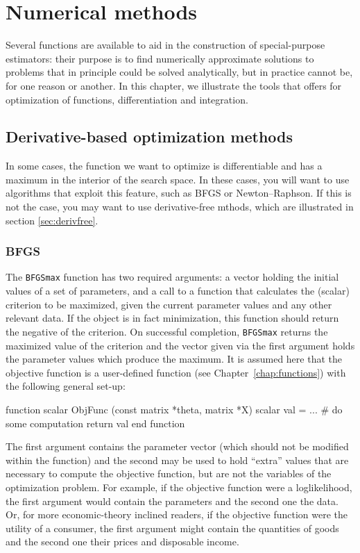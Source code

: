 \chapter{Numerical methods}
\label{chap:numerical}

Several functions are available to aid in the construction of
special-purpose estimators: their purpose is to find numerically
approximate solutions to problems that in principle could be solved
analytically, but in practice cannot be, for one reason or another. In
this chapter, we illustrate the tools that  offers for
optimization of functions, differentiation and integration.

\section{Derivative-based optimization methods}

In some cases, the function we want to optimize is differentiable and
has a maximum in the interior of the search space. In these cases, you
will want to use algorithms that exploit this feature, such as BFGS or
Newton--Raphson. If this is not the case, you may want to use
derivative-free mthods, which are illustrated in section \ref{sec:derivfree}.

\subsection{BFGS}
\label{sec:BFGSmax}

The \texttt{BFGSmax} function has two required arguments: a vector
holding the initial values of a set of parameters, and a call to a
function that calculates the (scalar) criterion to be maximized, given
the current parameter values and any other relevant data.  If the
object is in fact minimization, this function should return the
negative of the criterion.  On successful completion, \texttt{BFGSmax}
returns the maximized value of the criterion and the vector given via
the first argument holds the parameter values which produce the
maximum.  It is assumed here that the objective function is a
user-defined function (see Chapter~\ref{chap:functions}) with the
following general set-up:
%
\begin{code}
function scalar ObjFunc (const matrix *theta, matrix *X)
  scalar val = ...  # do some computation
  return val
end function
\end{code}

The first argument contains the parameter vector (which should not be
modified within the function) and the second may be used to hold
``extra'' values that are necessary to compute the objective function,
but are not the variables of the optimization problem. For example, if
the objective function were a loglikelihood, the first argument would
contain the parameters and the second one the data. Or, for more
economic-theory inclined readers, if the objective function were the
utility of a consumer, the first argument might contain the quantities
of goods and the second one their prices and disposable income.


